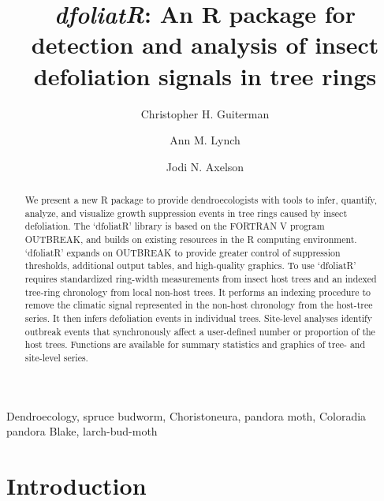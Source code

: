 \documentclass[review]{elsarticle} %
\begin{document}
\begin{frontmatter}

  \title{\emph{dfoliatR}: An R package for detection and analysis of insect defoliation signals in tree rings}
    \author[a,b]{Christopher H. Guiterman}
    \author[a,c]{Ann M. Lynch}
    \author[c]{Jodi N. Axelson}
      \address[a]{Laboratory of Tree-Ring Research, University of Arizona, 1215 E Lowell St.~Box 210045, Tucson, AZ, 85721}
    \address[b]{Three Pines Forest Research, LLC, PO Box 225, Etna, NH, 03750}
    \address[c]{U.S. Forest Service, Rocky Mountain Research Station, 1215 E Lowell St.~Box 210045, Tucson, AZ, 85721}
    \address[d]{Dept of Environmental Science, Policy \& Management, University of California, Berkeley, Berkeley, CA 94720}
  
  \begin{abstract}
  We present a new R package to provide dendroecologists with tools to infer, quantify, analyze, and visualize growth suppression events in tree rings caused by insect defoliation. The `dfoliatR' library is based on the FORTRAN V program OUTBREAK, and builds on existing resources in the R computing environment. `dfoliatR' expands on OUTBREAK to provide greater control of suppression thresholds, additional output tables, and high-quality graphics. To use `dfoliatR' requires standardized ring-width measurements from insect host trees and an indexed tree-ring chronology from local non-host trees. It performs an indexing procedure to remove the climatic signal represented in the non-host chronology from the host-tree series. It then infers defoliation events in individual trees. Site-level analyses identify outbreak events that synchronously affect a user-defined number or proportion of the host trees. Functions are available for summary statistics and graphics of tree- and site-level series.
  
  \hfill\break
  \end{abstract}
   \begin{keyword} Dendroecology, spruce budworm, Choristoneura, pandora moth, Coloradia pandora Blake, larch-bud-moth
\newpage\end{keyword}
 \end{frontmatter}

\hypertarget{introduction}{%
\section{Introduction}\label{introduction}}
\end{document}
